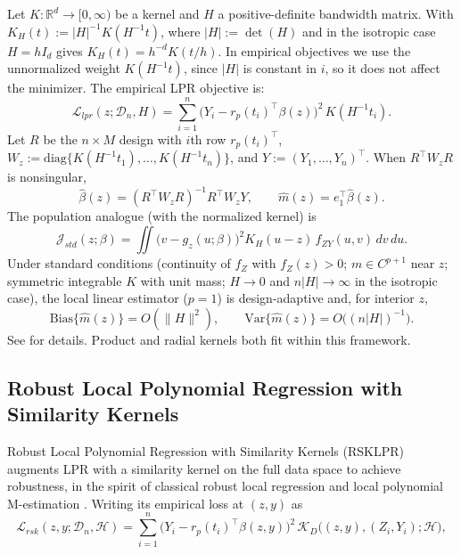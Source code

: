 \documentclass[final,1p,times,authoryear]{elsarticle}
\newcommand{\R}{\mathbb{R}}
\newcommand{\D}{\mathcal{D}}
\newcommand{\K}{\mathcal{K}}
\newcommand{\Lcal}{\mathcal{L}}
\newcommand{\Hcal}{\mathcal{H}}
\newcommand{\Jcal}{\mathcal{J}}
\begin{document}
Let $K:\R^d\to[0,\infty)$ be a kernel and $H$ a positive-definite bandwidth matrix. With $K_H(t):=|H|^{-1}K(H^{-1}t)$, where $|H|:=\det(H)$ and in the isotropic case $H=hI_d$ gives $K_H(t)=h^{-d}K(t/h)$. 
In empirical objectives we use the unnormalized weight $K(H^{-1}t)$, since $|H|$ is constant in $i$, so it does not affect the minimizer. The empirical LPR objective is:
\begin{equation}
\label{eq:lpr_loss}
\Lcal_{lpr}(z;\D_n,H)=\sum_{i=1}^{n}\big(Y_i-r_p(t_i)^\top\beta(z)\big)^2 \, K(H^{-1}t_i).
\end{equation}
Let $R$ be the $n\times M$ design with $i$th row $r_p(t_i)^\top$, $W_z:=\mathrm{diag}\{K(H^{-1}t_1),\ldots,K(H^{-1}t_n)\}$, and $Y:=(Y_1,\ldots,Y_n)^\top$. When $R^\top W_z R$ is nonsingular,
\[
\hat\beta(z)=(R^\top W_z R)^{-1}R^\top W_z Y,\qquad \hat m(z)=e_1^\top\hat\beta(z).
\]
The population analogue (with the normalized kernel) is
\begin{equation}
\label{eq:lpr_pop}
\Jcal_{std}(z;\beta)=\iint\big(v-g_z(u;\beta)\big)^2 K_H(u-z)\, f_{ZY}(u,v)\, dv\,du.
\end{equation}
Under standard conditions (continuity of $f_Z$ with $f_Z(z)>0$; $m\in C^{p+1}$ near $z$; symmetric integrable $K$ with unit mass; $H\to0$ and $n|H|\to\infty$ in the isotropic case), the local linear estimator ($p=1$) is design-adaptive and, for interior $z$,
\[
\mathrm{Bias}\{\hat m(z)\}=O(\|H\|^{2}),\qquad \mathrm{Var}\{\hat m(z)\}=O\big((n|H|)^{-1}\big).
\]
See \citep{fan1993local,fan1996local,loader1999local} for details. Product and radial kernels both fit within this framework.


\subsection{Robust Local Polynomial Regression with Similarity Kernels}
\label{s:background_rsklpr}
Robust Local Polynomial Regression with Similarity Kernels (RSKLPR) \citep{shulman2025robust} augments LPR with a similarity kernel on the full data space to achieve robustness, in the spirit of classical robust local regression and local polynomial M-estimation \citep{cleveland1979robust,jiang2001robust}. Writing its empirical loss at $(z,y)$ as
\begin{equation}
\label{eq:rsk_loss}
\Lcal_{rsk}(z,y;\D_n,\Hcal)
=\sum_{i=1}^{n}\Big(Y_i-r_p(t_i)^\top\beta(z,y)\Big)^2\,
\K_D\big((z,y),(Z_i,Y_i);\Hcal\big),
\end{equation}
\end{document}
